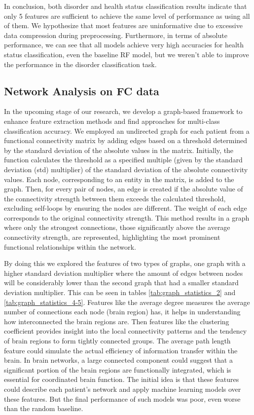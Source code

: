 \documentclass[fleqn,moreauthors,10pt]{ds_report}
\begin{document}
In conclusion, both disorder and health status classification results indicate that only 5 features are sufficient to achieve the same level of performance as using all of them. We hypothesize that most features are uninformative due to excessive data compression during preprocessing. Furthermore, in terms of absolute performance, we can see that all models achieve very high accuracies for health status classification, even the baseline RF model, but we weren't able to improve the performance in the disorder classification task.

\subsection*{Network Analysis on FC data}
In the upcoming stage of our research, we develop a graph-based framework to enhance feature extraction methods and find approaches for multi-class classification accuracy. We employed an undirected graph for each patient from a functional connectivity matrix by adding edges based on a threshold determined by the standard deviation of the absolute values in the matrix. Initially, the function calculates the threshold as a specified multiple (given by the standard deviation (std) multiplier) of the standard deviation of the absolute connectivity values. Each node, corresponding to an entity in the matrix, is added to the graph. Then, for every pair of nodes, an edge is created if the absolute value of the connectivity strength between them exceeds the calculated threshold, excluding self-loops by ensuring the nodes are different. The weight of each edge corresponds to the original connectivity strength. This method results in a graph where only the strongest connections, those significantly above the average connectivity strength, are represented, highlighting the most prominent functional relationships within the network. 

By doing this we explored the features of two types of graphs, one graph with a higher standard deviation multiplier where the amount of edges between nodes will be considerably lower than the second graph that had a smaller standard deviation multiplier. This can be seen in tables \ref{tab:graph_statistics_2} and \ref{tab:graph_statistics_4-5}. Features like the average degree measures the average number of connections each node (brain region) has, it helps in understanding how interconnected the brain regions are. Then features like the clustering coefficient provides insight into the local connectivity patterns and the tendency of brain regions to form tightly connected groups. The average path length feature could simulate the actual efficiency of information transfer within the brain. In brain networks, a large connected component could suggest that a significant portion of the brain regions are functionally integrated, which is essential for coordinated brain function. The initial idea is that these features could describe each patient's network and apply machine learning models over these features. But the final performance of such models was poor, even worse than the random baseline.
\end{document}

